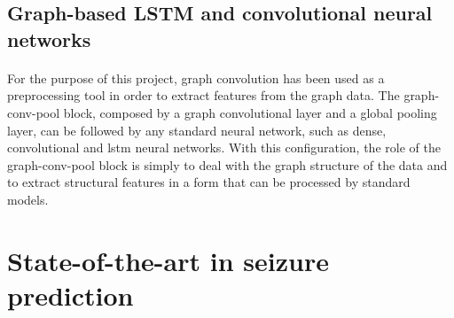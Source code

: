 \subsection{Graph-based LSTM and convolutional neural networks}
\paragraph{} For the purpose of this project, graph convolution has been used as a preprocessing tool in order to extract features from the graph data. The graph-conv-pool block, composed by a graph convolutional layer and a global pooling layer, can be followed by any standard neural network, such as dense, convolutional and \acs{lstm} neural networks. With this configuration, the role of the graph-conv-pool block is simply to deal with the graph structure of the data and to extract structural features in a form that can be processed by standard models.

\section{State-of-the-art in seizure prediction}